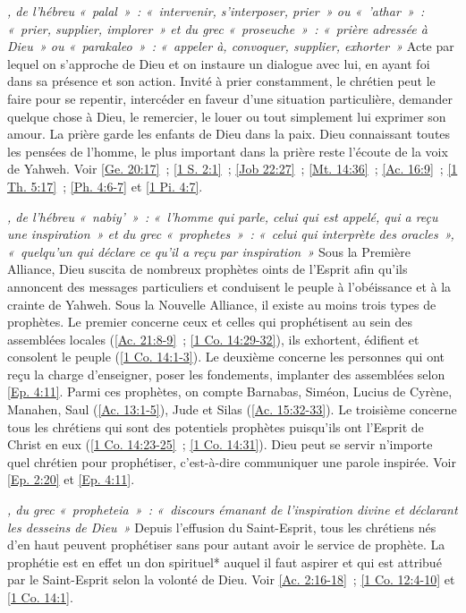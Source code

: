 \begin{multicols}{2}
\textit{, de l'hébreu «~palal~»~: «~intervenir, s'interposer, prier~» ou «~'athar~»~: «~prier, supplier, implorer~» et du grec «~proseuche~»~: «~prière adressée à Dieu~» ou «~parakaleo~»~: «~appeler à, convoquer, supplier, exhorter~»}\newline
Acte par lequel on s'approche de Dieu et on instaure un dialogue avec lui, en ayant foi dans sa présence et son action. Invité à prier constamment, le chrétien peut le faire pour se repentir, intercéder en faveur d'une situation particulière, demander quelque chose à Dieu, le remercier, le louer ou tout simplement lui exprimer son amour. La prière garde les enfants de Dieu dans la paix. Dieu connaissant toutes les pensées de l'homme, le plus important dans la prière reste l'écoute de la voix de Yahweh. Voir \vref{Ge. 20:17}~; \vref{1 S. 2:1}~; \vref{Job 22:27}~; \vref{Mt. 14:36}~; \vref{Ac. 16:9}~; \vref{1 Th. 5:17}~; \vref{Ph. 4:6-7} et \vref{1 Pi. 4:7}.

\textit{, de l'hébreu «~nabiy'~»~: «~l'homme qui parle, celui qui est appelé, qui a reçu une inspiration~» et du grec «~prophetes~»~: «~celui qui interprète des oracles~», «~quelqu'un qui déclare ce qu'il a reçu par inspiration~»}\newline
Sous la Première Alliance, Dieu suscita de nombreux prophètes oints de l'Esprit afin qu'ils annoncent des messages particuliers et conduisent le peuple à l'obéissance et à la crainte de Yahweh. Sous la Nouvelle Alliance, il existe au moins trois types de prophètes. Le premier concerne ceux et celles qui prophétisent au sein des assemblées locales (\vref{Ac. 21:8-9}~; \vref{1 Co. 14:29-32}), ils exhortent, édifient et consolent le peuple (\vref{1 Co. 14:1-3}). Le deuxième concerne les personnes qui ont reçu la charge d'enseigner, poser les fondements, implanter des assemblées selon \vref{Ep. 4:11}. Parmi ces prophètes, on compte Barnabas, Siméon, Lucius de Cyrène, Manahen, Saul (\vref{Ac. 13:1-5}), Jude et Silas (\vref{Ac. 15:32-33}). Le troisième concerne tous les chrétiens qui sont des potentiels prophètes puisqu'ils ont l'Esprit de Christ en eux (\vref{1 Co. 14:23-25}~; \vref{1 Co. 14:31}). Dieu peut se servir n'importe quel chrétien pour prophétiser, c'est-à-dire communiquer une parole inspirée. Voir \vref{Ep. 2:20} et \vref{Ep. 4:11}.

\textit{, du grec «~propheteia~»~: «~discours émanant de l'inspiration divine et déclarant les desseins de Dieu~»}\newline
Depuis l'effusion du Saint-Esprit, tous les chrétiens nés d'en haut peuvent prophétiser sans pour autant avoir le service de prophète. La prophétie est en effet un don spirituel* auquel il faut aspirer et qui est attribué par le Saint-Esprit selon la volonté de Dieu. Voir \vref{Ac. 2:16-18}~; \vref{1 Co. 12:4-10} et \vref{1 Co. 14:1}.


\end{multicols}
